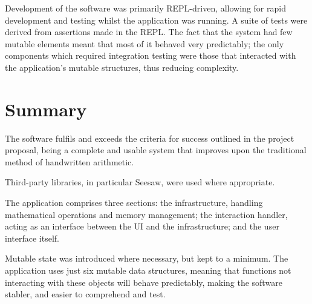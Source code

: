 \documentclass[12pt,twoside,notitlepage,xetex]{report}
\begin{document}
Development of the software was primarily REPL-driven, allowing for rapid development and testing whilst the application was running.  A suite of tests were derived from assertions made in the REPL.  The fact that the system had few mutable elements meant that most of it behaved very predictably; the only components which required integration testing were those that interacted with the application's mutable structures, thus reducing complexity.%
%
%

\section{Summary}

The software fulfils and exceeds the criteria for success outlined in the project proposal, being a complete and usable system that improves upon the traditional method of handwritten arithmetic.

Third-party libraries, in particular Seesaw, were used where appropriate.

The application comprises three sections: the infrastructure, handling mathematical operations and memory management; the interaction handler, acting as an interface between the UI and the infrastructure; and the user interface itself.

Mutable state was introduced where necessary, but kept to a minimum.  The application uses just six mutable data structures, meaning that functions not interacting with these objects will behave predictably, making the software stabler, and easier to comprehend and test.
\end{document}
